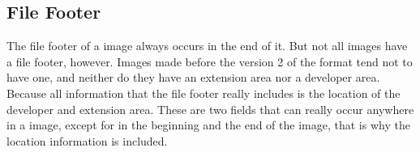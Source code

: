 \begin{refsection}
  \section{\tga File Footer}

  The file footer of a \tga image always occurs in the end of it. But
  not all \tga images have a file footer, however. Images made before
  the version 2 of the \tga format tend not to have one, and neither
  do they have an extension area nor a developer area. Because all
  information that the file footer really includes is the location of
  the developer and extension area. These are two fields that can
  really occur anywhere in a \tga image, except for in the beginning
  and the end of the image, that is why the location information is
  included.

  \printbibliography[heading=subbibliography]

\end{refsection}